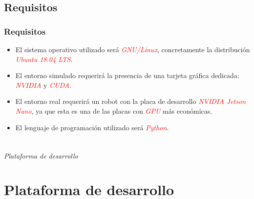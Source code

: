 \documentclass{beamer}
\begin{document}
\subsection{Requisitos}
\begin{frame}
	\frametitle{Requisitos}
	\begin{itemize}
		\item El sistema operativo utilizado será \textcolor{red}{\textit{GNU/Linux}}, concretamente la distribución \textcolor{red}{\textit{Ubuntu 18.04 LTS}}.
		\item El entorno simulado requerirá la presencia de una tarjeta gráfica dedicada: \textcolor{red}{\textit{NVIDIA}} y \textcolor{red}{\textit{CUDA}}.
		\item El entorno real requerirá un robot con la placa de desarrollo \textcolor{red}{\textit{NVIDIA Jetson Nano}}, ya que esta es una de las placas con
		      \textcolor{red}{\textit{GPU}} más económicas.
		\item El lenguaje de programación utilizado será \textcolor{red}{\textit{Python}}.
	\end{itemize}
\end{frame}


\section*{}
\begin{frame}{}
	\centering \Huge
	\emph{Plataforma de desarrollo}
\end{frame}

\section{Plataforma de desarrollo}
\end{document}
